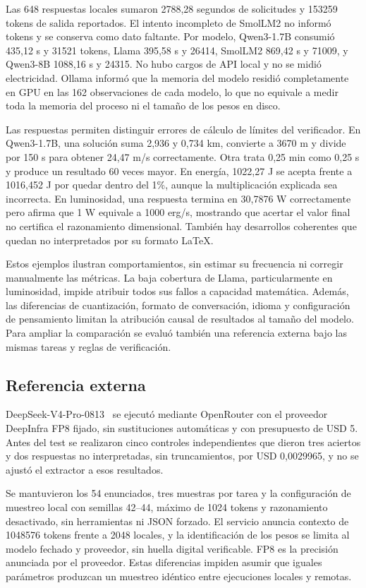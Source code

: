 Las 648 respuestas locales sumaron 2788,28 segundos de solicitudes y 153259
tokens de salida reportados. El intento incompleto de SmolLM2 no informó tokens
y se conserva como dato faltante. Por modelo, Qwen3-1.7B consumió 435,12 s y
31521 tokens, Llama 395,58 s y 26414, SmolLM2 869,42 s y 71009, y Qwen3-8B
1088,16 s y 24315. No hubo cargos de API local y no se midió electricidad.
Ollama informó que la memoria del modelo residió completamente en GPU en
las 162 observaciones de cada modelo, lo que no equivale a medir toda la
memoria del proceso ni el tamaño de los pesos en disco.

Las respuestas permiten distinguir errores de cálculo de límites del verificador.
En Qwen3-1.7B, una solución suma 2,936 y 0,734 km, convierte a 3670 m y
divide por 150 s para obtener 24,47 m/s correctamente. Otra trata 0,25 min
como 0,25 s y produce un resultado 60 veces mayor. En energía, 1022,27 J
se acepta frente a 1016,452 J por quedar dentro del 1\%, aunque la multiplicación
explicada sea incorrecta. En luminosidad, una respuesta termina en 30,7876 W
correctamente pero afirma que 1 W equivale a 1000 erg/s, mostrando que acertar
el valor final no certifica el razonamiento dimensional. También hay desarrollos
coherentes que quedan no interpretados por su formato LaTeX.

Estos ejemplos ilustran comportamientos, sin estimar su frecuencia ni corregir
manualmente las métricas. La baja cobertura de Llama, particularmente en
luminosidad, impide atribuir todos sus fallos a capacidad matemática. Además,
las diferencias de cuantización, formato de conversación, idioma y configuración
de pensamiento limitan la atribución causal de resultados al tamaño del modelo.
Para ampliar la comparación se evaluó también una referencia externa bajo las
mismas tareas y reglas de verificación.

\subsection{Referencia externa}
DeepSeek-V4-Pro-0813~\cite{deepseek} se ejecutó mediante OpenRouter con el
proveedor DeepInfra FP8 fijado, sin sustituciones automáticas y con presupuesto
de USD 5. Antes del test se realizaron cinco controles independientes que dieron
tres aciertos y dos respuestas no interpretadas, sin truncamientos, por
USD 0,0029965, y no se ajustó el extractor a esos resultados.

Se mantuvieron los 54 enunciados, tres muestras por tarea y la configuración
de muestreo local con semillas 42--44, máximo de 1024 tokens y razonamiento
desactivado, sin herramientas ni JSON forzado. El servicio anuncia contexto de
1048576 tokens frente a 2048 locales, y la identificación de los pesos se limita
al modelo fechado y proveedor, sin huella digital verificable. FP8 es la precisión
anunciada por el proveedor. Estas diferencias impiden asumir que iguales
parámetros produzcan un muestreo idéntico entre ejecuciones locales y remotas.


